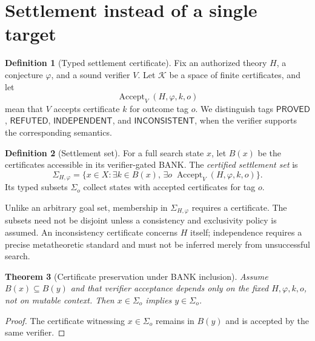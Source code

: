 \documentclass[11pt]{article}
\newtheorem{theorem}{Theorem}[section]
\theoremstyle{definition}
\newtheorem{definition}[theorem]{Definition}
\begin{document}
\section{Settlement instead of a single target}
\begin{definition}[Typed settlement certificate]
Fix an authorized theory $H$, a conjecture $\varphi$, and a sound verifier $V$. Let $\mathcal K$ be a space of finite certificates, and let
\[
\operatorname{Accept}_V(H,\varphi,k,o)
\]
mean that $V$ accepts certificate $k$ for outcome tag $o$. We distinguish tags $\mathsf{PROVED}$, $\mathsf{REFUTED}$, $\mathsf{INDEPENDENT}$, and $\mathsf{INCONSISTENT}$, when the verifier supports the corresponding semantics.
\end{definition}
\begin{definition}[Settlement set]
For a full search state $x$, let $B(x)$ be the certificates accessible in its verifier-gated BANK. The \emph{certified settlement set} is
\[
\Sigma_{H,\varphi}=
\{x\in X:\exists k\in B(x),\,\exists o\;
\operatorname{Accept}_V(H,\varphi,k,o)\}.
\]
Its typed subsets $\Sigma_o$ collect states with accepted certificates for tag $o$.
\end{definition}
Unlike an arbitrary goal set, membership in $\Sigma_{H,\varphi}$ requires a certificate. The subsets need not be disjoint unless a consistency and exclusivity policy is assumed. An inconsistency certificate concerns $H$ itself; independence requires a precise metatheoretic standard and must not be inferred merely from unsuccessful search.
\begin{theorem}[Certificate preservation under BANK inclusion]
Assume $B(x)\subseteq B(y)$ and that verifier acceptance depends only on the fixed $H,\varphi,k,o$, not on mutable context. Then $x\in\Sigma_o$ implies $y\in\Sigma_o$.
\end{theorem}
\begin{proof}
The certificate witnessing $x\in\Sigma_o$ remains in $B(y)$ and is accepted by the same verifier.
\end{proof}
\end{document}

